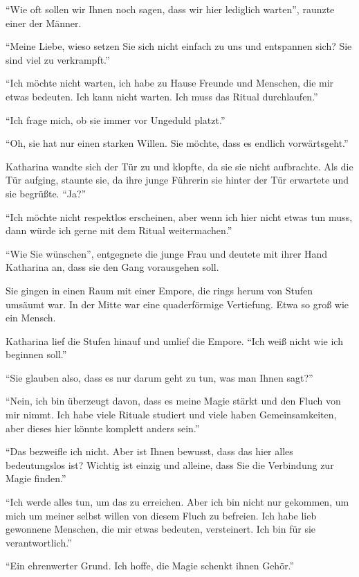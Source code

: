 \enquote{Wie oft sollen wir Ihnen noch sagen, dass wir hier lediglich warten}, raunzte einer der Männer.

\enquote{Meine Liebe, wieso setzen Sie sich nicht einfach zu uns und entspannen sich? Sie sind viel zu verkrampft.}

\enquote{Ich möchte nicht warten, ich habe zu Hause Freunde und Menschen, die mir etwas bedeuten. Ich kann nicht warten. Ich muss das Ritual durchlaufen.}

\enquote{Ich frage mich, ob sie immer vor Ungeduld platzt.}

\enquote{Oh, sie hat nur einen starken Willen. Sie möchte, dass es endlich vorwärtsgeht.}

Katharina wandte sich der Tür zu und klopfte, da sie sie nicht aufbrachte. Als die Tür aufging, staunte sie, da ihre junge Führerin sie hinter der Tür erwartete und sie begrüßte. \enquote{Ja?}

\enquote{Ich möchte nicht respektlos erscheinen, aber wenn ich hier nicht etwas tun muss, dann würde ich gerne mit dem Ritual weitermachen.}

\enquote{Wie Sie wünschen}, entgegnete die junge Frau und deutete mit ihrer Hand Katharina an, dass sie den Gang vorausgehen soll.

Sie gingen in einen Raum mit einer Empore, die rings herum von Stufen umsäumt war. In der Mitte war eine quaderförmige Vertiefung. Etwa so groß wie ein Mensch.

Katharina lief die Stufen hinauf und umlief die Empore. \enquote{Ich weiß nicht wie ich beginnen soll.}

\enquote{Sie glauben also, dass es nur darum geht zu tun, was man Ihnen sagt?}

\enquote{Nein, ich bin überzeugt davon, dass es meine Magie stärkt und den Fluch von mir nimmt. Ich habe viele Rituale studiert und viele haben Gemeinsamkeiten, aber dieses hier könnte komplett anders sein.}

\enquote{Das bezweifle ich nicht. Aber ist Ihnen bewusst, dass das hier alles bedeutungslos ist? \gst Wichtig ist einzig und alleine, dass Sie die Verbindung zur Magie finden.}

\enquote{Ich werde alles tun, um das zu erreichen. Aber ich bin nicht nur gekommen, um mich um meiner selbst willen von diesem Fluch zu befreien. Ich habe lieb gewonnene Menschen, die mir etwas bedeuten, versteinert. Ich bin für sie verantwortlich.}

\enquote{Ein ehrenwerter Grund. Ich hoffe, die Magie schenkt ihnen Gehör.}


